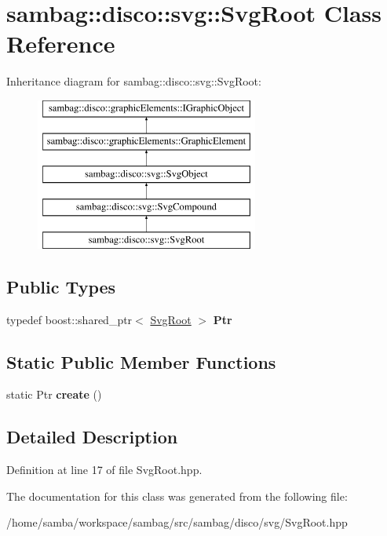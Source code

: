 \hypertarget{classsambag_1_1disco_1_1svg_1_1_svg_root}{
\section{sambag::disco::svg::SvgRoot Class Reference}
\label{classsambag_1_1disco_1_1svg_1_1_svg_root}
}
Inheritance diagram for sambag::disco::svg::SvgRoot:\begin{figure}[H]
\begin{center}
\leavevmode
\includegraphics[height=5.000000cm]{classsambag_1_1disco_1_1svg_1_1_svg_root}
\end{center}
\end{figure}
\subsection*{Public Types}
\begin{DoxyCompactItemize}
\item 
\hypertarget{classsambag_1_1disco_1_1svg_1_1_svg_root_ad634cc2a6f9798fa68c99d6f0401adc9}{
typedef boost::shared\_\-ptr$<$ \hyperlink{classsambag_1_1disco_1_1svg_1_1_svg_root}{SvgRoot} $>$ {\bfseries Ptr}}
\label{classsambag_1_1disco_1_1svg_1_1_svg_root_ad634cc2a6f9798fa68c99d6f0401adc9}

\end{DoxyCompactItemize}
\subsection*{Static Public Member Functions}
\begin{DoxyCompactItemize}
\item 
\hypertarget{classsambag_1_1disco_1_1svg_1_1_svg_root_a970150ebe3be1ceef4c07d0b552e68ee}{
static Ptr {\bfseries create} ()}
\label{classsambag_1_1disco_1_1svg_1_1_svg_root_a970150ebe3be1ceef4c07d0b552e68ee}

\end{DoxyCompactItemize}


\subsection{Detailed Description}


Definition at line 17 of file SvgRoot.hpp.



The documentation for this class was generated from the following file:\begin{DoxyCompactItemize}
\item 
/home/samba/workspace/sambag/src/sambag/disco/svg/SvgRoot.hpp\end{DoxyCompactItemize}
